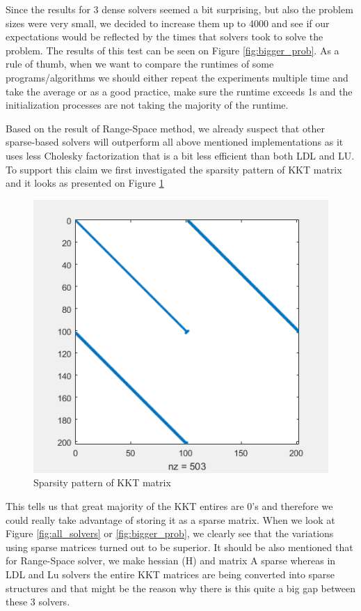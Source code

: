 Since the results for 3 dense solvers seemed a bit surprising, but also the problem sizes were very small, we decided to increase them up to 4000 and see if our expectations would be reflected by the times that solvers took to solve the problem. The results of this test can be seen on Figure \ref{fig:bigger_prob}. As a rule of thumb, when we want to compare the runtimes of some programs/algorithms we should either repeat the experiments multiple time and take the average or as a good practice, make sure the runtime exceeds 1s and the initialization processes are not taking the majority of the runtime. 

Based on the result of Range-Space method, we already suspect that other sparse-based solvers will outperform all above mentioned implementations as it uses less Cholesky factorization that is a bit less efficient than both LDL and LU. To support this claim we first investigated the sparsity pattern of KKT matrix and it looks as presented on Figure \ref{fig:kkt_sparsity}

\begin{figure}[ht!]
    \centering
    \includegraphics[width=.5\textwidth]{fig/kkt_sparsity.PNG}
    \caption{Sparsity pattern of KKT matrix}
    \label{fig:kkt_sparsity}
\end{figure}

This tells us that great majority of the KKT entires are 0's and therefore we could really take advantage of storing it as a sparse matrix. When we look at Figure \ref{fig:all_solvers} or \ref{fig:bigger_prob}, we clearly see that the variations using sparse matrices turned out to be superior. It should be also mentioned that for Range-Space solver, we make hessian (H) and matrix A sparse whereas in LDL and Lu solvers the entire KKT matrices are being converted into sparse structures and that might be the reason why there is this quite a big gap between these 3 solvers. 
\newpage